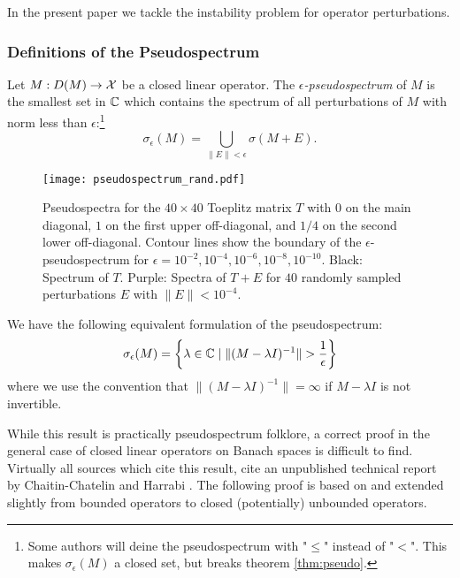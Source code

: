 In the present paper we tackle the instability problem for operator perturbations. 


\subsubsection{Definitions of the Pseudospectrum}

\begin{definition}
    Let $M : D(M) \to \mathcal{X}$ be a closed linear operator. The 
    \emph{$\epsilon$-pseudospectrum} of $M$ is 
    the smallest set in $\mathbb{C}$ which contains the spectrum of all perturbations of $M$ 
    with norm less than $\epsilon$:\footnote{
        Some authors will deine the pseudospectrum with "$\leq$" instead of "$<$". This 
        makes $\sigma_\epsilon (M)$ a closed set, but breaks theorem \ref{thm:pseudo}.}
    \begin{equation}
        \label{eq:pseudospectrum_union}
        \sigma_\epsilon (M) = \bigcup_{\| E \| < \epsilon} \sigma (M + E). 
    \end{equation}
\end{definition}

\begin{figure}
    \centering
    \texttt{[image: pseudospectrum\_rand.pdf]}
    \caption{
        Pseudospectra for the $40 \times 40$ Toeplitz matrix $T$ with $0$ on the main 
        diagonal, $1$ on the first upper off-diagonal, and $1/4$ on the second lower 
        off-diagonal. Contour lines show the boundary of the $\epsilon$-pseudospectrum 
        for $\epsilon = 10^{-2}, 10^{-4}, 10^{-6}, 10^{-8}, 10^{-10}$. Black: Spectrum 
        of $T$. Purple: Spectra of $T + E$ for $40$ randomly sampled 
        perturbations $E$ with $\| E \| < 10^{-4}$. 
    }
\end{figure}

\begin{theorem}
    \label{thm:pseudo}
    We have the following equivalent formulation of the pseudospectrum:
    \begin{equation}
        \sigma_\epsilon (M) = \left\{ \lambda \in \mathbb{C} \mid 
        \| (M - \lambda I)^{-1} \| > \frac{1}{\epsilon} \right\} 
    \end{equation}
    where we use the convention that $\| (M - \lambda I)^{-1} \| = \infty$ if 
    $M - \lambda I$ is not invertible. 
\end{theorem}

\begin{remark}
    While this result is practically pseudospectrum folklore, a correct proof in the general 
    case of closed linear operators on Banach spaces is difficult to find. Virtually all 
    sources which cite this result, cite an unpublished technical report by Chaitin-Chatelin 
    and Harrabi \cite{unpublished_pseudospectrum_result}. The following proof is based on 
    \cite{boettcher2005spectral} and extended slightly from bounded operators to closed 
    (potentially) unbounded operators. 
\end{remark}

